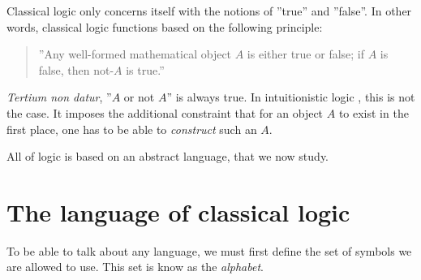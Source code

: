 \documentclass[11pt,a4paper]{article}
\begin{document}
Classical logic \LK{} only concerns itself with the notions of ''true'' and ''false''.
In other words, classical logic functions based on the following principle:
\begin{quote}
    ''Any well-formed mathematical object \(A\) is either true or false;
    if \(A\) is false, then not-\(A\) is true.''
\end{quote}
\emph{Tertium non datur}, ''\(A\) or not \(A\)'' is always true.
In intuitionistic logic \LJ, this is not the case.
It imposes the additional constraint that for an object \(A\)
to exist in the first place, one has to be able to \emph{construct}
such an \(A\).

All of logic is based on an abstract language, that we now study.

\section{\texorpdfstring{The language of classical logic \LK}{The language of classical logic LK}}

To be able to talk about any language, we must first define the set of symbols we are allowed to use.
This set is know as the \emph{alphabet}.
\end{document}
